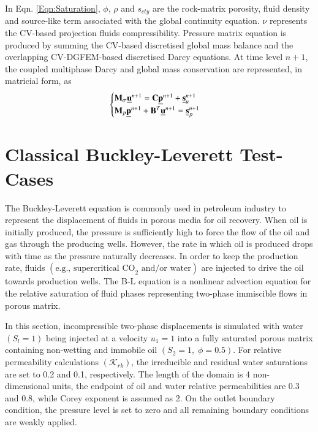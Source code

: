 \documentclass[preprint,authoryear,12pt]{elsarticle}
\begin{document}
In Eqn. \ref{Eqn:Saturation}, $\phi$, $\rho$ and $s_{cty}$ are the rock-matrix porosity, fluid density and source-like term associated with the global continuity equation. $\nu$ represents the CV-based projection fluids compressibility. Pressure matrix equation is produced by summing the CV-based discretised global mass balance and the overlapping CV-DGFEM-based discretised Darcy equations. At time level $n+1$, the coupled multiphase Darcy and global mass conservation are represented, in matricial form, as
\begin{equation}
\begin{cases}
\mathbf{M}_{\sigma} \underline{\bf u}^{n+1} = \mathbf{C}\underline{\bf p}^{n+1} + \underline{\bf s}_{u}^{n+1} \\
\mathbf{M}_{p} \underline{\bf p}^{n+1} + \mathbf{B}^{T} \underline{\bf u}^{n+1} = \underline{\bf s}_{p}^{n+1}
\end{cases}
\end{equation}

\section{Classical Buckley-Leverett Test-Cases}\label{classical_BL}
The Buckley-Leverett equation \citep[B-L,][]{doster_2011,proskurowski_1981} is commonly used in petroleum industry to represent the displacement of fluids in porous media for oil recovery. When oil is initially produced, the pressure is sufficiently high to force the flow of the oil and gas through the producing wells. However, the rate in which oil is produced drops with time as the pressure naturally decreases. In order to keep the production rate, fluids $\left(\text{e.g., supercritical CO}_{2}\text{ and/or water}\right)$ are injected to drive the oil towards production wells. The B-L equation is a nonlinear advection equation for the relative saturation of fluid phases representing two-phase immiscible flows in porous matrix. 

In this section, incompressible two-phase displacements is simulated with water $\left(S_{l}=1\right)$ being injected at a velocity $u_{1}=1$ into a fully saturated porous matrix containing non-wetting and immobile oil $\left(S_{2}=1,\;\phi=0.5\right)$. For relative permeability calculations $\left(\mathcal{K}_{rk}\right)$, the irreducible and residual water saturations are set to 0.2 and 0.1, respectively. The length of the domain is 4 non-dimensional units, the endpoint of oil and water relative permeabilities are 0.3 and 0.8, while Corey exponent is assumed as 2. On the outlet boundary condition, the pressure level is set to zero and all remaining boundary conditions are weakly applied. 
\end{document}
